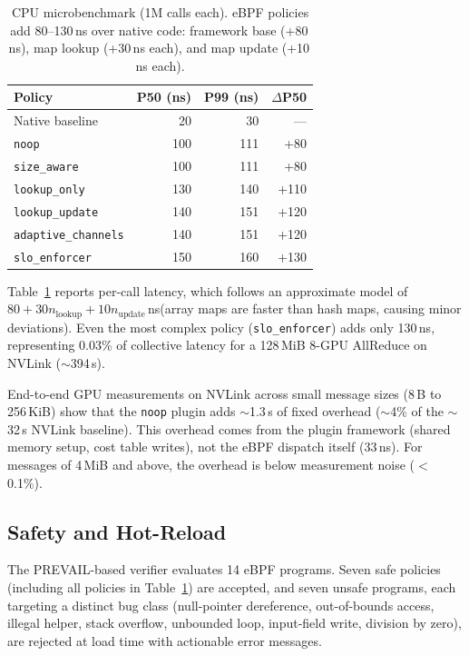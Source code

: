 \documentclass[sigplan,10pt]{acmart}
\newcommand{\us}{\,\textmu{}s\xspace}
\newcommand{\ns}{\,ns\xspace}
\begin{document}
\begin{table}[t]
\centering
\caption{CPU microbenchmark (1M calls each). eBPF policies add
80--130\ns over native code: framework base (+80\ns), map lookup
(+30\ns each), and map update (+10\ns each).}
\label{tab:overhead}
\small
\begin{tabular}{lrrr}
\toprule
\textbf{Policy} & \textbf{P50 (ns)} & \textbf{P99 (ns)} & \textbf{$\Delta$P50} \\
\midrule
Native baseline    &  20 &  30 & --- \\
\texttt{noop}              & 100 & 111 & +80 \\
\texttt{size\_aware}       & 100 & 111 & +80 \\
\texttt{lookup\_only}      & 130 & 140 & +110 \\
\texttt{lookup\_update}    & 140 & 151 & +120 \\
\texttt{adaptive\_channels}& 140 & 151 & +120 \\
\texttt{slo\_enforcer}     & 150 & 160 & +130 \\
\bottomrule
\end{tabular}
\end{table}

Table~\ref{tab:overhead} reports per-call latency, which
follows an approximate model of $80 + 30n_{\text{lookup}} +
10n_{\text{update}}$\ns (array maps are faster than hash maps,
causing minor deviations). Even the most complex policy
(\texttt{slo\_enforcer}) adds only 130\ns, representing 0.03\% of
collective latency for a 128\,MiB 8-GPU AllReduce on NVLink (${\sim}$394\us).

End-to-end GPU measurements on NVLink across small message sizes
(8\,B to 256\,KiB) show that the \texttt{noop} plugin adds
${\sim}$1.3\us of fixed overhead (${\sim}$4\% of the ${\sim}$32\us
NVLink baseline). This overhead comes from the plugin framework (shared
memory setup, cost table writes), not the eBPF dispatch itself
(33\ns). For messages of 4\,MiB and above, the overhead is below
measurement noise ($<$0.1\%).

\subsection{Safety and Hot-Reload}
\label{sec:eval-verifier}

The PREVAIL-based verifier evaluates 14 eBPF programs. Seven safe
policies (including all policies in Table~\ref{tab:overhead}) are
accepted, and seven unsafe programs, each targeting a distinct bug class
(null-pointer dereference, out-of-bounds access, illegal helper,
stack overflow, unbounded loop, input-field write, division by
zero), are rejected at load time with actionable error messages.
\end{document}
